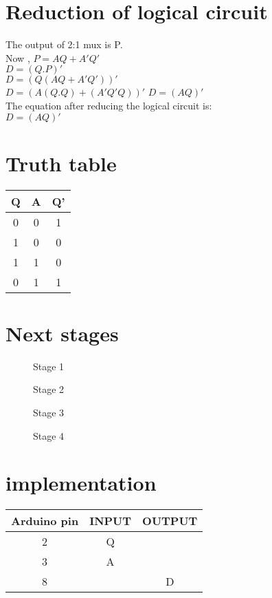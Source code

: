 \documentclass{article}
\begin{document}
\section{Reduction of logical circuit}
The output of 2:1 mux is P.\\
Now , $P=AQ+A'Q'$\\
$D=(Q.P)'$\\
$D=(Q(AQ+A'Q'))'$\\
 $D=(A(Q.Q)+(A'Q'Q))'$
 $D=(AQ)'$\\
 The equation after reducing the logical circuit is:\\
 $D=(AQ)'$\\

 \section{Truth table}
 \begin{table}[h]
  \centering
   \begin{tabular}{|c|c|c|}
   \hline
   Q & A & Q'\\
   \hline
   0 & 0 & 1\\
   \hline
   1 & 0 & 0\\
   \hline
   1 & 1 & 0\\
   \hline
   0 & 1 & 1\\
   \hline
   \end{tabular}
   \end{table}
\section{Next stages}
\begin{figure}[h]
	\centering
	
	\caption{Stage 1}
\end{figure}
\pagebreak
\begin{figure}[h]
        \centering                                  
        \caption{Stage 2}
\end{figure}
\begin{figure}[h]
        \centering
	
	\caption{Stage 3}
\end{figure}
\pagebreak
\begin{figure}[h]
        \centering                                  
        \caption{Stage 4}
\end{figure} 

\section{implementation}
\begin{table}[h]
  \centering
  \begin{tabular}{|c|c|c|}
\hline
\textbf{Arduino pin} & \textbf{INPUT} & \textbf{OUTPUT}\\
\hline
2 & Q &\\
\hline
3 & A &\\
\hline
8 & & D\\
\hline
  \end{tabular}
\end{table}
\end{document}
